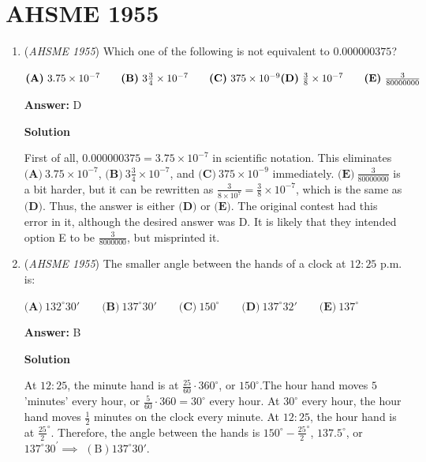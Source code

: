 \section{AHSME 1955}
        \begin{enumerate}
        	\item (\textit{AHSME 1955}) Which one of the following is not equivalent to $0.000000375$? 


 $\textbf{(A)}\ 3.75\times 10^{-7}\qquad\textbf{(B)}\ 3\frac{3}{4}\times 10^{-7}\qquad\textbf{(C)}\ 375\times 10^{-9}\\ \textbf{(D)}\ \frac{3}{8}\times 10^{-7}\qquad\textbf{(E)}\ \frac{3}{80000000}$

 \textbf{Answer: }D



\textbf{Solution}

First of all, $0.000000375 = 3.75 \times 10^{-7}$ in scientific notation. This eliminates $\textbf{(A)}\ 3.75\times 10^{-7}$, $\textbf{(B)}\ 3\frac{3}{4}\times 10^{-7}$, and $\textbf{(C)}\ 375\times 10^{-9}$ immediately. $\textbf{(E)}\ \frac{3}{80000000}$ is a bit harder, but it can be rewritten as $\frac{3}{8 \times 10^{7}} = \frac{3}{8} \times 10^{-7}$, which is the same as $\textbf{(D)}$. Thus, the answer is either $\textbf{(D)}$ or $\textbf{(E)}$.  The original contest had this error in it, although the desired answer was D.  It is likely that they intended option E to be $\frac{3}{8000000}$, but misprinted it.

 


	\item (\textit{AHSME 1955}) The smaller angle between the hands of a clock at $12:25$ p.m. is: 


 $\textbf{(A)}\ 132^\circ 30'\qquad\textbf{(B)}\ 137^\circ 30'\qquad\textbf{(C)}\ 150^\circ\qquad\textbf{(D)}\ 137^\circ 32'\qquad\textbf{(E)}\ 137^\circ$

 \textbf{Answer: }B



\textbf{Solution}

At $12:25$, the minute hand is at $\frac{25}{60}\cdot 360^\circ$, or $150^\circ$.The hour hand moves $5$ 'minutes' every hour, or $\frac{5}{60}\cdot 360 = 30^\circ$ every hour. At $30^\circ$ every hour, the hour hand moves $\frac{1}{2}$ minutes on the clock every minute. At $12:25$, the hour hand is at $\frac{25}{2}^\circ$. Therefore, the angle between the hands is $150^\circ - \frac{25}{2}^\circ$, $137.5^\circ$, or $137^{\circ} 30^{'} \implies$ $\boxed{\mathrm{(B) 137^\circ 30'}}$.


\end{enumerate}
